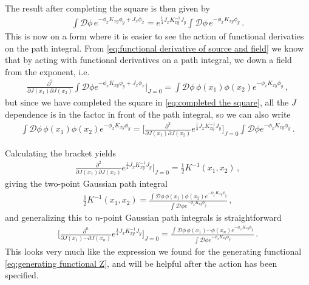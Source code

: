 The result after completing the square is then given by
\begin{align}\label{eq:completed the square}
    \int\mathcal{D}\phi\,e^{-\phi_{x} K_{xy}\phi_{y}+J_{x}\phi_{x}}=e^{\frac{1}{4}J_{x}K_{xy}^{-1}J_{y}}\int\mathcal{D}\phi\,e^{-\phi_{x} K_{xy}\phi_{y}}\,.
\end{align}
This is now on a form where it is easier to see the action of functional derivaties on the path integral. From \cref{eq:functional derivative of source and field} we know that by acting with functional derivatives on a path integral, we  down a field from the exponent, i.e.
\begin{align}
    \frac{\partial^{2}}{\partial J(x_1)\partial J(x_2)}\int\mathcal{D}\phi e^{-\phi_{x}K_{xy}\phi_{y}+J_{x}\phi_{x}}\big|_{J=0}=\int\mathcal{D}\phi\,\phi(x_1)\phi(x_2)e^{-\phi_{x}K_{xy}\phi_{y}}\,,
\end{align}
but since we have completed the square in \cref{eq:completed the square}, all the $J$ dependence is in the factor in front of the path integral, so we can also write
\begin{align}
    \int\mathcal{D}\phi\,\phi(x_1)\phi(x_2)e^{-\phi_{x}K_{xy}\phi_{y}}=\Big[\frac{\partial^{2}}{\partial J(x_1)\partial J(x_2)}e^{\frac{1}{4}J_{x}K_{xy}^{-1}J_{y}}\Big]_{J=0}\int\mathcal{D}\phi e^{-\phi_{x}K_{xy}\phi_{y}}\,.
\end{align}

Calculating the bracket yields
\begin{align}
    \frac{\partial^{2}}{\partial J(x_1)\partial J(x_2)}e^{\frac{1}{4}J_{x}K_{xy}^{-1}J_{y}}\Big|_{J=0}=\frac{1}{2}K^{-1}(x_1,x_2)\,,
\end{align}
giving the two-point Gaussian path integral
\begin{align}\label{eq:two-point gaussian}
    \frac{1}{2}K^{-1}(x_1,x_2)=\frac{\int\mathcal{D}\phi\,\phi(x_1)\phi(x_2)e^{-\phi_{x}K_{xy}\phi_{y}}}{\int\mathcal{D}\phi e^{-\phi_{x}K_{xy}\phi_{y}}}\,,
\end{align}
and generalizing this to $n$-point Gaussian path integrals is straightforward
\begin{align}
    \Big[\frac{\partial^{n}}{\partial J(x_1)\cdots\partial J(x_n)}e^{\frac{1}{4}J_{x}K_{xy}^{-1}J_{y}}\Big]_{J=0}=\frac{\int\mathcal{D}\phi\,\phi(x_1)\cdots\phi(x_n)e^{-\phi_{x}K_{xy}\phi_{y}}}{\int\mathcal{D}\phi e^{-\phi_{x}K_{xy}\phi_{y}}}\,.
\end{align}
This looks very much like the expression we found for the generating functional \cref{eq:generating functional Z}, and will be helpful after the action has been specified.

